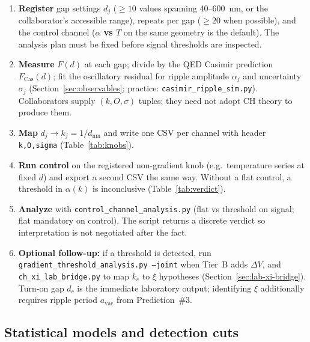 \documentclass[11pt,a4paper]{article}
\begin{document}
\begin{enumerate}[label=\textbf{Step \arabic*:}, leftmargin=*]
  \item \textbf{Register} gap settings $d_j$ ($\geq 10$ values spanning 40--600~nm, or the collaborator's accessible range), repeats per gap ($\geq 20$ when possible), and the control channel (\textbf{$\alpha$ vs $T$} on the same geometry is the default).
  The analysis plan must be fixed before signal thresholds are inspected.

  \item \textbf{Measure} $F(d)$ at each gap; divide by the QED Casimir prediction $F_{\mathrm{Cas}}(d)$; fit the oscillatory residual for ripple amplitude $\alpha_j$ and uncertainty $\sigma_j$ (Section~\ref{sec:observables}; practice: \texttt{casimir\_ripple\_sim.py}).
  Collaborators supply $(k, O, \sigma)$ tuples; they need not adopt CH theory to produce them.

  \item \textbf{Map} $d_j \to k_j = 1/d_{\mathrm{nm}}$ and write one CSV per channel with header \texttt{k,O,sigma} (Table~\ref{tab:knobs}).

  \item \textbf{Run control} on the registered non-gradient knob (e.g.\ temperature series at fixed $d$) and export a second CSV the same way.
  Without a flat control, a threshold in $\alpha(k)$ is inconclusive (Table~\ref{tab:verdict}).

  \item \textbf{Analyze} with \texttt{control\_channel\_analysis.py} (flat vs threshold on signal; flat mandatory on control).
  The script returns a discrete verdict so interpretation is not negotiated after the fact.

  \item \textbf{Optional follow-up:} if a threshold is detected, run \texttt{gradient\_threshold\_analysis.py --joint} when Tier~B adds $\Delta V$, and \texttt{ch\_xi\_lab\_bridge.py} to map $k_c$ to $\xi$ hypotheses (Section~\ref{sec:lab-xi-bridge}).
  Turn-on gap $d_c$ is the immediate laboratory output; identifying $\xi$ additionally requires ripple period $a_{\mathrm{vac}}$ from Prediction~\#3.
\end{enumerate}

\subsection{Statistical models and detection cuts}
\end{document}
